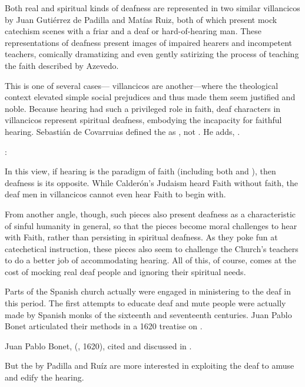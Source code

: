 Both real and spiritual kinds of deafness are represented in two similar villancicos by Juan Gutiérrez de Padilla and Matías Ruiz, both of which present mock catechism scenes with a friar and a deaf or hard-of-hearing man.
These representations of deafness present images of impaired hearers and incompetent teachers, comically dramatizing and even gently satirizing the process of teaching the faith described by Azevedo. 

This is one of several cases--- villancicos are another---where the theological context elevated simple social prejudices and thus made them seem justified and noble.\XXX
Because hearing had such a privileged role in faith, deaf characters in villancicos represent spiritual deafness, embodying the incapacity for faithful hearing.
Sebastián de Covarruias defined the  as , not .
He adds, .%
  \begin{Footnote}
  \autocite[s.v.~\mkbibemph{sordo}]{Covarrubias:Tesoro}:
  \end{Footnote}
In this view, if hearing is the paradigm of faith (including both  and ), then deafness is its opposite.
While Calderón's Judaism heard Faith without faith, the deaf men in villancicos cannot even hear Faith to begin with.

From another angle, though, such pieces also present deafness as a characteristic of sinful humanity in general, so that the pieces become moral challenges to hear with Faith, rather than persisting in spiritual deafness.
As they poke fun at catechetical instruction, these pieces also seem to challenge the Church's teachers to do a better job of accommodating hearing.
All of this, of course, comes at the cost of mocking real deaf people and ignoring their spiritual needs.\XXX{}

Parts of the Spanish church actually were engaged in ministering to the deaf in this period.
The first attempts to educate deaf and mute people were actually made by Spanish monks of the sixteenth and seventeenth centuries.
Juan Pablo Bonet articulated their methods in a 1620 treatise on .%
  \begin{Footnote}
  Juan Pablo Bonet,  (\XXX, 1620), cited and discussed in \autocite{Plann:DeafEducationSpain}.
  \end{Footnote}
But the  by Padilla and Ruíz are more interested in exploiting the deaf to amuse and edify the hearing.

